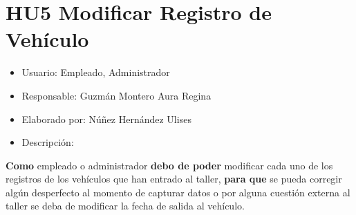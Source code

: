 \section{HU5 Modificar Registro de Vehículo}
\begin{itemize}
	\item Usuario: Empleado, Administrador
	\item Responsable: Guzmán Montero Aura Regina
	\item Elaborado por: Núñez Hernández Ulises
	\item Descripción:\\
\end{itemize}

\textbf{Como} empleado o administrador \textbf{debo de poder} modificar cada uno de los registros de los vehículos que han entrado al taller, \textbf{para que} se pueda corregir algún desperfecto al momento de capturar datos o por alguna cuestión externa al taller se deba de modificar la fecha de salida al vehículo.